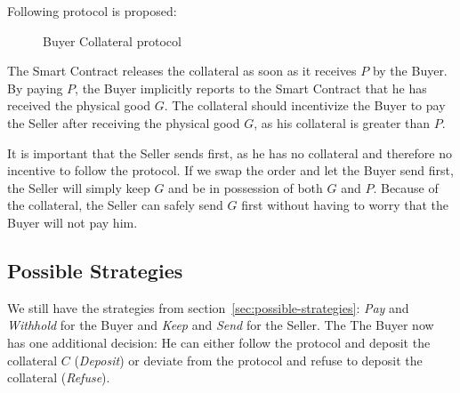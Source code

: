 \documentclass{cacthesis}
\begin{document}
Following protocol is proposed:
\begin{figure}[htb!]
    \centering
    \caption{Buyer Collateral protocol}
    \label{pro:Buyer-col}
\end{figure}

The Smart Contract releases the collateral as soon as it receives $P$ by the Buyer. By paying $P$, the Buyer implicitly reports to the Smart Contract that he has received the physical good $G$. The collateral should incentivize the Buyer to pay the Seller after receiving the physical good $G$, as his collateral is greater than $P$.\newline

It is important that the Seller sends first, as he has no collateral and therefore no incentive to follow the protocol. If we swap the order and let the Buyer send first, the Seller will simply keep $G$ and be in possession of both $G$ and $P$. Because of the collateral, the Seller can safely send $G$ first without having to worry that the Buyer will not pay him.\newline

\subsection{Possible Strategies}
\label{sec:possible-strategies-Buyercol}
We still have the strategies from section~\ref{sec:possible-strategies}: \emph{Pay} and \emph{Withhold} for the Buyer and \emph{Keep} and \emph{Send} for the Seller. The The Buyer now has one additional decision: He can either follow the protocol and deposit the collateral $C$ (\emph{Deposit}) or deviate from the protocol and refuse to deposit the collateral (\emph{Refuse}).
\end{document}
